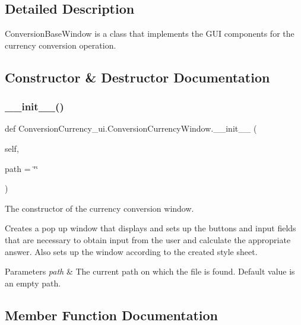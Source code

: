 \subsection{Detailed Description}
Conversion\+Base\+Window is a class that implements the G\+UI components for the currency conversion operation. 

\subsection{Constructor \& Destructor Documentation}
\mbox{\label{class_conversion_currency__ui_1_1_conversion_currency_window_a5219de9caa768775d8a5c638bb20cd17}} 
\subsubsection{\texorpdfstring{\+\_\+\+\_\+init\+\_\+\+\_\+()}{\_\_init\_\_()}}
{\footnotesize\ttfamily def Conversion\+Currency\+\_\+ui.\+Conversion\+Currency\+Window.\+\_\+\+\_\+init\+\_\+\+\_\+ (\begin{DoxyParamCaption}\item[{}]{self,  }\item[{}]{path = {\ttfamily \char`\"{}\char`\"{}} }\end{DoxyParamCaption})}



The constructor of the currency conversion window. 

Creates a pop up window that displays and sets up the buttons and input fields that are necessary to obtain input from the user and calculate the appropriate answer. Also sets up the window according to the created style sheet. 
\begin{DoxyParams}{Parameters}
{\em path} & The current path on which the file is found. Default value is an empty path. \\
\hline
\end{DoxyParams}


\subsection{Member Function Documentation}
\mbox{\label{class_conversion_currency__ui_1_1_conversion_currency_window_ad8504b8dbbe0d321f4c2374e17c92fcf}} 

